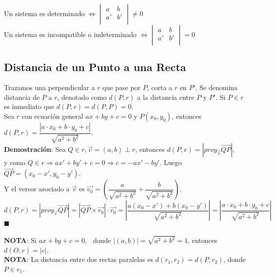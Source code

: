 \documentclass[11pt,a4paper]{article}
\newcommand*{\QEDA}{\null\nobreak\hfill\ensuremath{\blacksquare}}
\begin{document}
\noindent Un sistema es determinado $\iff \begin{vmatrix}a&b\\a'&b'\\\end{vmatrix} \not = 0$\\
\noindent Un sistema es incompatible o indeterminado $\iff \begin{vmatrix}a&b\\a'&b'\\\end{vmatrix} = 0$

\subsection{Distancia de un Punto a una Recta}
Trazamos una perpendicular a $r$ que pase por $P$, corta a $r$ en $P'$. Se denomina distancia de $P$ a $r$, denotado como $d(P,r)$ a la distancia entre $P$ y $P'$. Si $P\in r$ es inmediato que $d(P,r)=d(P,P)=0$.\\
\noindent Sea $r$ con ecuaci\'on general $ax+by+c=0$ y $P(x_0,y_0)$, entonces $d(P,r) = \dfrac{|a\cdot x_0 + b \cdot y_0 + c|}{\sqrt{a^2+b^2}}$.\\
\textbf{Demostraci\'on}: Sea $Q \in r, \overrightarrow{v}=(a,b) \perp r$, entonces $d(P,r)=|proy_{\overrightarrow{v}}\overrightarrow{QP}|$,\\ y como $Q \in r \Rightarrow ax'+by'+c=0 \Rightarrow c= -ax'-by'$. Luego $\overrightarrow{QP} = (x_0 - x', y_0 - y')$.\\ Y el versor asociado a $\overrightarrow{v}$ es $\overrightarrow{v_0} = \left(\dfrac{a}{\sqrt{a^2+b^2}} + \dfrac{b}{\sqrt{a^2+b^2}}\right)$.\\ $d(P,r) = |proy_{\overrightarrow{v}}\overrightarrow{QP}| = |\overrightarrow{QP} \times \overrightarrow{v_0}| \cdot \overrightarrow{v_0} = \left| \dfrac{a(x_0 - x') + b (x_0-y')}{\sqrt{a^2+b^2}} \right| = \left|\dfrac{a \cdot x_0+b \cdot y_0+c}{\sqrt{a^2+b^2}}\right|$ \QEDA \\ \\

\noindent \textbf{NOTA}: Si $ax+by + c = 0,\ \ \text{ donde } |(a,b)| = \sqrt{a^2+b^2} = 1$, entonces $d(O,r) = |c|$.\\
\textbf{NOTA}: La distancia entre dos rectas paralelas es $d(r_1,r_2) = d(P,r_2)$, donde $P\in r_1$.
\end{document}

